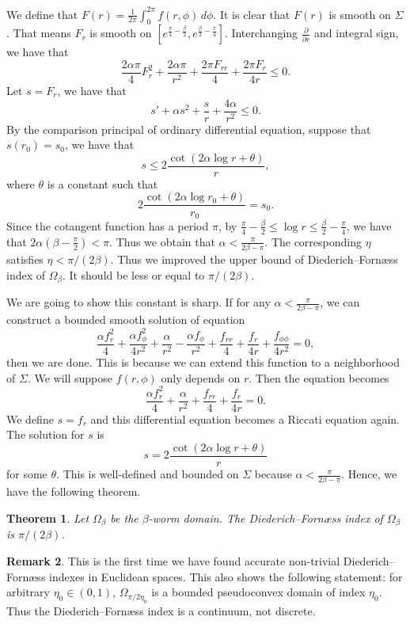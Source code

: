 \documentclass[11pt]{article}
\theoremstyle{plain} \numberwithin{equation}{section}
\newtheorem{theorem}{Theorem}[section]
\theoremstyle{definition}
\newtheorem{remark}[theorem]{Remark}
\begin{document}
We define that $F(r)=\frac{1}{2\pi}\int_{0}^{2\pi} f(r,\phi)\, d\phi$. It is clear that $F(r)$ is smooth on $\Sigma$. That means $F_r$ is smooth on $[e^{\frac{\pi}{4}-\frac{\beta}{2}}, e^{\frac{\beta}{2}-\frac{\pi}{4}}]$. Interchanging $\frac{\partial}{\partial r}$ and integral sign, we have that
\[\frac{2\alpha\pi}{4} F_r^2+\frac{2\alpha\pi}{r^2}+\frac{2\pi F_{rr}}{4}+\frac{2\pi F_r}{4r}\leq 0.\]
Let $s=F_r$, we have that
\[s'+\alpha s^2+\frac{s}{r}+\frac{4\alpha}{r^2}\leq 0.\]
By the comparison principal of ordinary differential equation, suppose that $s(r_0)=s_0$, we have that 
\[s\leq 2\frac{\cot(2\alpha\log r+\theta)}{r},\] where $\theta$ is a constant such that \[ 2\frac{\cot(2\alpha\log r_0+\theta)}{r_0}=s_0.\] Since the cotangent function has a period $\pi$, by $\frac{\pi}{4}-\frac{\beta}{2}\leq\log r\leq\frac{\beta}{2}-\frac{\pi}{4}$, we have that $2\alpha(\beta-\frac{\pi}{2})<\pi$. Thus we obtain that $\alpha<\frac{\pi}{2\beta-\pi}$. The corresponding $\eta$ satisfies $\eta<\pi/{(2\beta)}$. Thus we improved the upper bound of Diederich--Forn\ae ss index of $\Omega_\beta$. It should be less or equal to $\pi/{(2\beta)}$.

We are going to show this constant is sharp. If for any $\alpha<\frac{\pi}{2\beta-\pi}$, we can construct a bounded smooth solution of equation \[\frac{\alpha f_r^2}{4}+\frac{\alpha f_\phi^2}{4r^2}+\frac{\alpha}{r^2}-\frac{\alpha f_\phi}{r^2}+\frac{f_{rr}}{4}+\frac{f_r}{4r}+\frac{f_{\phi\phi}}{4r^2}=0,\] then we are done. This is because we can extend this function to a neighborhood of $\Sigma$. We will suppose $f(r,\phi)$ only depends on $r$. Then the equation becomes \[\frac{\alpha f_r^2}{4}+\frac{\alpha}{r^2}+\frac{f_{rr}}{4}+\frac{f_r}{4r}=0.\] We define $s=f_r$ and this differential equation becomes a Riccati equation again. The solution for $s$ is \[s=2\frac{\cot(2\alpha\log r+\theta)}{r}\] for some $\theta$. This is well-defined and bounded on $\Sigma$ because $\alpha<\frac{\pi}{2\beta-\pi}$. Hence, we have the following theorem.

\begin{theorem}\label{calcworm}
	Let $\Omega_\beta$ be the $\beta$-worm domain. The Diederich--Forn\ae ss index of $\Omega_\beta$ is $\pi/{(2\beta)}$.
\end{theorem}

\begin{remark}
	This is the first time we have found accurate non-trivial Diederich--Forn\ae ss indexes in Euclidean spaces. This also shows the following statement: for arbitrary $\eta_0\in(0,1)$, $\Omega_{\pi/2\eta_0}$ is a bounded pseudoconvex domain of index $\eta_0$. Thus the Diederich--Forn\ae ss index is a continuum, not discrete.
\end{remark}
\end{document}
